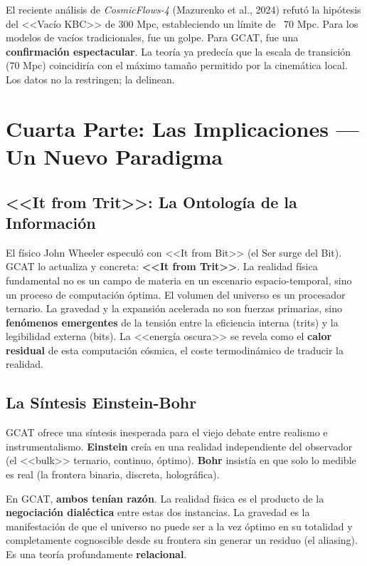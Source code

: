 \documentclass[12pt, a4paper]{article}
\begin{document}
El reciente análisis de \textit{CosmicFlows-4} (Mazurenko et al., 2024) refutó la hipótesis del <<Vacío KBC>> de 300 Mpc, estableciendo un límite de ~70 Mpc. Para los modelos de vacíos tradicionales, fue un golpe. Para GCAT, fue una \textbf{confirmación espectacular}. La teoría ya predecía que la escala de transición (70 Mpc) coincidiría con el máximo tamaño permitido por la cinemática local. Los datos no la restringen; la delinean.

\section{Cuarta Parte: Las Implicaciones — Un Nuevo Paradigma}

\subsection{<<It from Trit>>: La Ontología de la Información}

El físico John Wheeler especuló con <<It from Bit>> (el Ser surge del Bit). GCAT lo actualiza y concreta: \textbf{<<It from Trit>>}. La realidad física fundamental no es un campo de materia en un escenario espacio-temporal, sino un proceso de computación óptima. El volumen del universo es un procesador ternario. La gravedad y la expansión acelerada no son fuerzas primarias, sino \textbf{fenómenos emergentes} de la tensión entre la eficiencia interna (trits) y la legibilidad externa (bits). La <<energía oscura>> se revela como el \textbf{calor residual} de esta computación cósmica, el coste termodinámico de traducir la realidad.

\subsection{La Síntesis Einstein-Bohr}

GCAT ofrece una síntesis inesperada para el viejo debate entre realismo e instrumentalismo. \textbf{Einstein} creía en una realidad independiente del observador (el <<bulk>> ternario, continuo, óptimo). \textbf{Bohr} insistía en que solo lo medible es real (la frontera binaria, discreta, holográfica).

En GCAT, \textbf{ambos tenían razón}. La realidad física es el producto de la \textbf{negociación dialéctica} entre estas dos instancias. La gravedad es la manifestación de que el universo no puede ser a la vez óptimo en su totalidad y completamente cognoscible desde su frontera sin generar un residuo (el aliasing). Es una teoría profundamente \textbf{relacional}.
\end{document}
